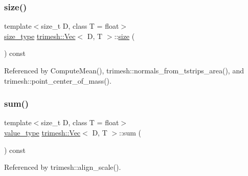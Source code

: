 \mbox{\label{classtrimesh_1_1Vec_a5244372932950795782c00aa7149e5e6}} 
\subsubsection{\texorpdfstring{size()}{size()}}
{\footnotesize\ttfamily template$<$size\+\_\+t D, class T = float$>$ \\
\hyperlink{classtrimesh_1_1Vec_a65397e05ed96e7723cf2d54dfff0ad0a}{size\+\_\+type} \hyperlink{classtrimesh_1_1Vec}{trimesh\+::\+Vec}$<$ D, T $>$\+::\hyperlink{namespacetrimesh_a1c71e2912be63f694df9e9991bddb15e}{size} (\begin{DoxyParamCaption}{ }\end{DoxyParamCaption}) const\hspace{0.3cm}{\ttfamily [inline]}}



Referenced by Compute\+Mean(), trimesh\+::normals\+\_\+from\+\_\+tstrips\+\_\+area(), and trimesh\+::point\+\_\+center\+\_\+of\+\_\+mass().

\mbox{\label{classtrimesh_1_1Vec_a067ed6c05d8df1235d9485d7c000b5ca}} 
\subsubsection{\texorpdfstring{sum()}{sum()}}
{\footnotesize\ttfamily template$<$size\+\_\+t D, class T = float$>$ \\
\hyperlink{classtrimesh_1_1Vec_a10a59253996e42d67c713f37592669df}{value\+\_\+type} \hyperlink{classtrimesh_1_1Vec}{trimesh\+::\+Vec}$<$ D, T $>$\+::sum (\begin{DoxyParamCaption}{ }\end{DoxyParamCaption}) const\hspace{0.3cm}{\ttfamily [inline]}}



Referenced by trimesh\+::align\+\_\+scale().

\mbox{\label{classtrimesh_1_1Vec_a8c4651f7c8cee19d66aa05d7f1b5518f}} 
